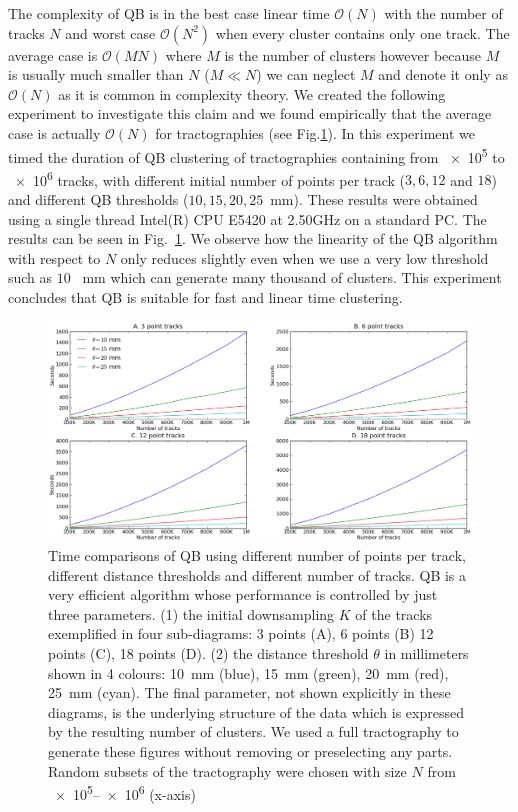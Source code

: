 \documentclass{bioinfo}
\begin{document}
The complexity of QB is in the best case linear time $\mathcal{O}(N)$
with the number of tracks $N$ and worst case $\mathcal{O}(N^{2})$ when
every cluster contains only one track. The average case is
$\mathcal{O}(MN)$ where $M$ is the number of clusters however because
$M$ is usually much smaller than $N$ ($M\ll N$) we can neglect $M$ and
denote it only as $\mathcal{O}(N)$ as it is common in complexity
theory. We created the following experiment to investigate this claim
and we found empirically that the average case is actually
$\mathcal{O}(N)$ for tractographies (see Fig.\ref{Flo:Speed1}).  In this
experiment we timed the duration of QB clustering of tractographies
containing from \num{e5} to \num{e6} tracks, with different initial
number of points per track ($3,6,12$ and $18$) and different QB
thresholds ($10,15,20,25$~mm). These results were obtained using
a single thread Intel(R) CPU E5420 at 2.50GHz on a standard
PC. The results can be seen in Fig.~\ref{Flo:Speed1}. We observe how the
linearity of the QB algorithm with respect to $N$ only reduces slightly
even when we use a very low threshold such as $10$ ~mm which can
generate many thousand of clusters. This experiment concludes that QB is
suitable for fast and linear time clustering.

\begin{figure}
\noindent \begin{centering}
\includegraphics[scale=0.23]{Figures/Fig_3_2x2+leg-box}
\par\end{centering}
\caption{Time comparisons of QB using different number of points per
  track, different distance thresholds and different number of
  tracks. QB is a very efficient algorithm whose performance is
  controlled by just three parameters. (1) the initial downsampling $K$
  of the tracks exemplified in four sub-diagrams: 3 points (A), 6 points
  (B) 12 points (C), 18 points (D). (2) the distance threshold $\theta$
  in millimeters shown in 4 colours: 10~mm (blue), 15~mm (green), 20~mm
  (red), 25~mm (cyan). The final parameter, not shown explicitly in
  these diagrams, is the underlying structure of the data which is
  expressed by the resulting number of clusters.  We used a full
  tractography to generate these figures without removing or
  preselecting any parts. Random subsets of the tractography were
  chosen with size $N$ from \numrange{e5}{e6} (x-axis)\label{Flo:Speed1}}
\end{figure}
\end{document}
